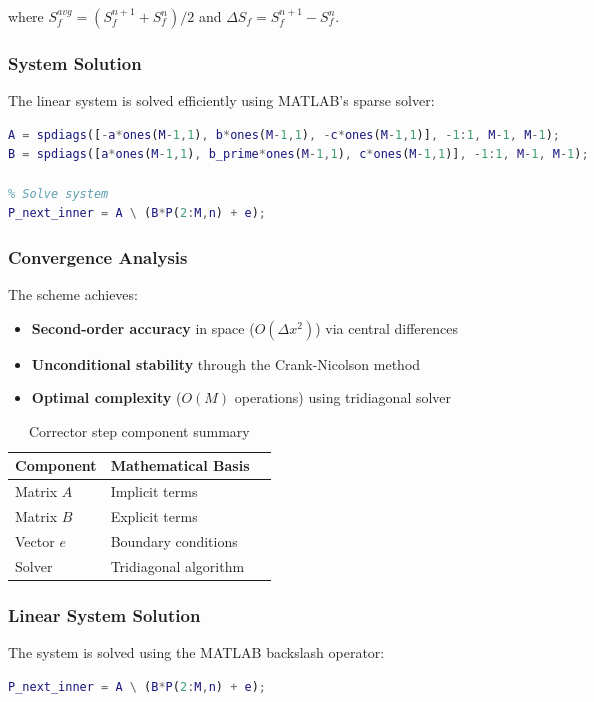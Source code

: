 \documentclass[12pt]{article}
\begin{document}
where $S_f^{avg} = (S_f^{n+1} + S_f^n)/2$ and $\Delta S_f = S_f^{n+1} - S_f^n$.
\subsubsection{System Solution}
The linear system is solved efficiently using MATLAB's sparse solver:

\begin{lstlisting}[language=Matlab,caption={Linear system solution}]
% Construct tridiagonal matrices
A = spdiags([-a*ones(M-1,1), b*ones(M-1,1), -c*ones(M-1,1)], -1:1, M-1, M-1);
B = spdiags([a*ones(M-1,1), b_prime*ones(M-1,1), c*ones(M-1,1)], -1:1, M-1, M-1);

% Solve system
P_next_inner = A \ (B*P(2:M,n) + e);
\end{lstlisting}

\subsubsection{Convergence Analysis}
The scheme achieves:
\begin{itemize}
\item \textbf{Second-order accuracy} in space ($O(\Delta x^2)$) via central differences
\item \textbf{Unconditional stability} through the Crank-Nicolson method
\item \textbf{Optimal complexity} ($O(M)$ operations) using tridiagonal solver
\end{itemize}

\begin{table}[h]
\centering
\caption{Corrector step component summary}
\begin{tabular}{lll}
\hline
Component & Mathematical Basis \\ \hline
Matrix $A$ & Implicit terms  \\
Matrix $B$ & Explicit terms \\
Vector $e$ & Boundary conditions  \\
Solver & Tridiagonal algorithm \\ \hline
\end{tabular}
\end{table}
\subsubsection{Linear System Solution}
The system is solved using the MATLAB backslash operator:

\begin{lstlisting}[language=Matlab,caption={System solution}]
P_next_inner = A \ (B*P(2:M,n) + e);  
\end{lstlisting}
\end{document}
